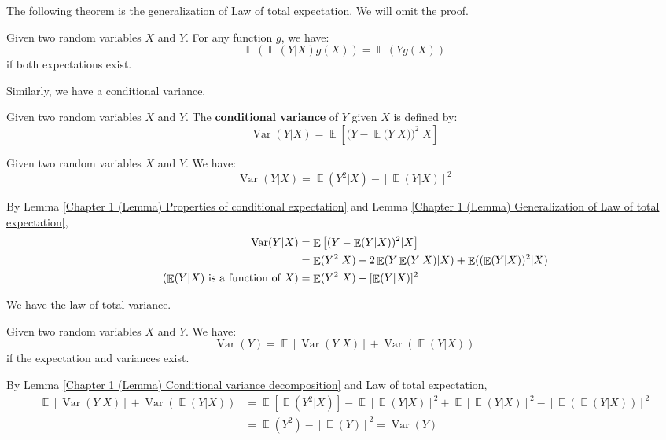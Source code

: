 \documentclass{huhtakm-template-book-v2}
\DeclareMathOperator{\E}{\mathbb{E}}
\DeclareMathOperator{\Var}{Var}
\begin{document}
The following theorem is the generalization of Law of total expectation. We will omit the proof.
\begin{lem}
	\label{Chapter 1 (Lemma) Generalization of Law of total expectation}
	Given two random variables $X$ and $Y$. For any function $g$, we have:
	\begin{equation*}
		\E(\E(Y|X)g(X))=\E(Yg(X))
	\end{equation*}
	if both expectations exist.
\end{lem}

\newpage
Similarly, we have a conditional variance.
\begin{defn}
	Given two random variables $X$ and $Y$. The \textbf{conditional variance} of $Y$ given $X$ is defined by:
	\begin{equation*}
		\Var(Y|X)=\E\left[(Y-\E(Y|X))^{2}|X\right]
	\end{equation*}
\end{defn}
\begin{lem}
	\label{Chapter 1 (Lemma) Conditional variance decomposition}
	Given two random variables $X$ and $Y$. We have:
	\begin{equation*}
		\Var(Y|X)=\E(Y^{2}|X)-[\E(Y|X)]^{2}
	\end{equation*}
\end{lem}
\begin{proofing}
	By Lemma \ref{Chapter 1 (Lemma) Properties of conditional expectation} and Lemma \ref{Chapter 1 (Lemma) Generalization of Law of total expectation},
	\begin{align*}
		\Var(Y|X)&=\E\left[(Y-\E(Y|X))^{2}|X\right]\\
		&=\E(Y^{2}|X)-2\E(Y\E(Y|X)|X)+\E((\E(Y|X))^{2}|X)\\
		\tag{$\E(Y|X)$ is a function of $X$}
		&=\E(Y^{2}|X)-[\E(Y|X)]^{2}
	\end{align*}
\end{proofing}
We have the law of total variance.
\begin{thm}
	Given two random variables $X$ and $Y$. We have:
	\begin{equation*}
		\Var(Y)=\E[\Var(Y|X)]+\Var(\E(Y|X))
	\end{equation*}
	if the expectation and variances exist.
\end{thm}
\begin{proofing}
	By Lemma \ref{Chapter 1 (Lemma) Conditional variance decomposition} and Law of total expectation,
	\begin{align*}
		\E[\Var(Y|X)]+\Var(\E(Y|X))&=\E[\E(Y^{2}|X)]-\E[\E(Y|X)]^{2}+\E[\E(Y|X)]^{2}-\left[\E(\E(Y|X))\right]^{2}\\
		&=\E(Y^{2})-[\E(Y)]^{2}=\Var(Y)
	\end{align*}
\end{proofing}
\end{document}
